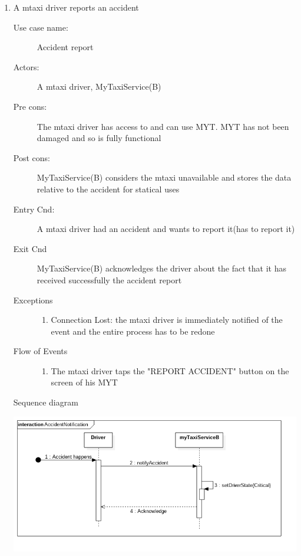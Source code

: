 \documentclass[11pt]{article} %
\begin{document}
\begin{enumerate}
	
	      \item A mtaxi driver reports an accident
		\begin{description}
		        \item [Use case name:] Accident report
		        \item [Actors:] A mtaxi driver, MyTaxiService(B)
		        \item [Pre cons:] The mtaxi driver has access to and can use MYT. MYT has not been damaged and so
		        is fully functional
		        \item [Post cons:] MyTaxiService(B) considers the mtaxi unavailable and stores the data
		        relative to the accident for statical uses
		        \item [Entry Cnd:] A mtaxi driver had an accident and wants to report it(has to report it)
		        \item [Exit Cnd] MyTaxiService(B) acknowledges the driver about the fact that it has received
		        successfully the accident report
		        \item [Exceptions]\hfill
			\begin{enumerate}
			          \item Connection Lost: the mtaxi driver is immediately notified of the event and the entire process has to be redone
			\end{enumerate}
		       \item [Flow of Events]\hfill
			\begin{enumerate}
			          \item The mtaxi driver taps the "REPORT ACCIDENT" button on the screen of his MYT
			\end{enumerate}
		\end{description}
		Sequence diagram
		\begin{center}
		\includegraphics[scale=0.52]{usecase11.png}
		\end{center}
	

\end{enumerate}
\end{document}
